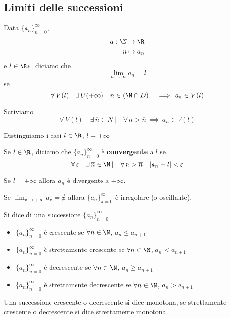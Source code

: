 \subsection{Limiti delle successioni}

Data $ \{a_{n} \}_{n=0}^\infty$, \begin{align*}
a:\N & \to \R \\
n & \mapsto a_{n} 
\end{align*} e $l \in \R*$, diciamo che 
\[
    \lim_{n\to\infty}a_{n}=l  
\]
se \[\forall\, V(l)\quad\exists\, U(+\infty)\quad n \in(\N \cap D)\quad\implies\,a_{n} \in V(l)\]

Scriviamo \[\forall\, V(l)\quad \exists\, \overline{n} \in N \,|\quad \forall\, n>\overline{n} \,\implies\, a_{n} \in V(l)\]

Distinguiamo i casi $ l \in \R $, $ l = \pm \infty $

Se $l\in \R$, diciamo che $ \{a_{n} \}_{n=0}^\infty $ è \textbf{convergente} a $ l $ se 
\[
    \forall\, \varepsilon\quad \exists\, \overline{n} \in \N \,|\quad \forall\, n>\overline{n}\quad |a_{n} -l |<\varepsilon
\]

Se $ l=\pm \infty $ allora $a_{n}$ è divergente a $ \pm\infty $.

Se $\displaystyle \lim_{n\to+\infty} a_{n}=\nexists $ allora $ \{a_{n}\}_{n=0 }^\infty$ è irregolare (o oscillante).



Si dice di una successione $\{a_{n} \}_{n=0}^\infty$

\begin{itemize}
    \item $\{a_{n} \}_{n=0}^\infty$ è crescente se $ \forall n \in \N $, $ a_{n} \le a_{n+1}  $
    \item $\{a_{n} \}_{n=0}^\infty$ è strettamente crescente se $ \forall n \in \N $, $ a_{n} < a_{n+1}  $
    \item $\{a_{n} \}_{n=0}^\infty$ è decrescente se $ \forall n \in \N $, $ a_{n} \ge a_{n+1}  $
    \item $\{a_{n} \}_{n=0}^\infty$ è strettamente decrescente se $ \forall n \in \N $, $ a_{n} > a_{n+1}  $
\end{itemize}
Una successione crescente o decrescente si dice monotona, se strettamente crescente o decrescente si dice strettamente monotona.

